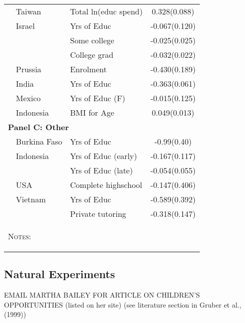 \begin{table}
\begin{tabular}{lllc}
\citet{Lee2008}                  &Taiwan   &Total ln(educ spend) &0.328(0.088)  \\
\citet{Angristetal2010}          &Israel   &Yrs of Educ          & -0.067(0.120)\\
                                 &         &Some college         & -0.025(0.025)\\
                                 &         &College grad         & -0.032(0.022)\\
\citet{Beckeretal2010}           &Prussia  &Enrolment            & -0.430(0.189)\\
\citet{KumarKugler2011}          &India    &Yrs of Educ          & -0.363(0.061)\\
\citet{FitzsimonsMalde2014}      &Mexico   &Yrs of Educ (F)      & -0.015(0.125)\\ 
\citet{MillimetWang2011}         &Indonesia&BMI for Age          &  0.049(0.013)\\
\midrule
\multicolumn{4}{l}{\textbf{Panel C: Other}} \\
\citet{Bougmaetal2015}           &Burkina Faso&Yrs of Educ        &-0.99(0.40)\\ 
\citet{Marlani2008}              &Indonesia   &Yrs of Educ (early)&-0.167(0.117)\\ 
                                 &            &Yrs of Educ (late) &-0.054(0.055)\\
\citet{Hotzetal1997}             &USA         &Complete highschool&-0.147(0.406)\\
\citet{DangRogers2013}           &Vietnam     &Yrs of Educ        &-0.589(0.392)\\
                                 &            &Private tutoring   &-0.318(0.147)\\
\bottomrule
\multicolumn{4}{p{10cm}}{\begin{footnotesize}\textsc{Notes:} \end{footnotesize}}
\end{tabular}     
\end{table}

\subsection{Natural Experiments}
EMAIL MARTHA BAILEY FOR ARTICLE ON CHILDREN'S OPPORTUNITIES (listed on her site)
\citet{OltmansHungerman2012, Gruberetal1999,PopEleches2006,BleakleyLange2009,
RosenzweigZhang2009, Qian2009,Hossain1989}
(see literature section in Gruber et al., (1999))

